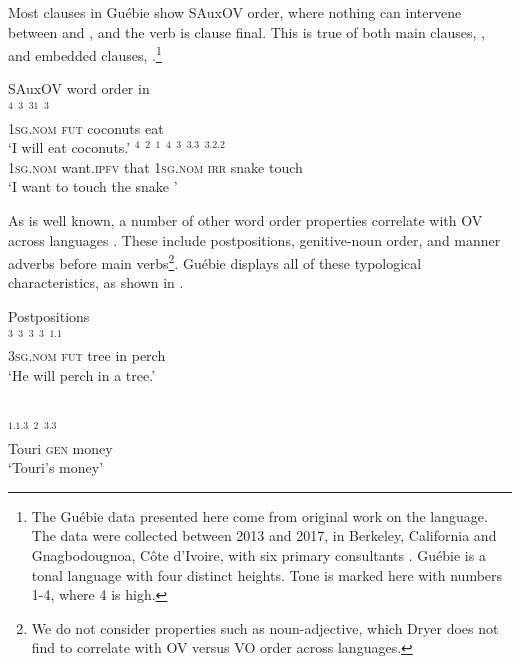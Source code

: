 \documentclass[output=paper]{LSP/langsci}
\begin{document}
Most clauses in Gu\'ebie show SAuxOV order, where nothing can intervene between  and , and the verb is clause final. This is true of both main clauses, , and embedded clauses, .\footnote{The Gu\'ebie data presented here come from original work on the language. The data were collected between 2013 and 2017, in Berkeley, California and Gnagbodougnoa, C\^ote d'Ivoire, with six primary consultants \citep[cf.][]{Sande:2017}. Gu\'ebie is a tonal language with four distinct  heights. Tone is marked here with numbers 1-4, where 4 is high.}

\ea 
\ea SAuxOV word order in \\ 
\gll {}$^{4}$ $^{3}$ $^{31}$ $^{3}$  \\
\textsc{1sg}.\textsc{nom} \textsc{fut} coconuts eat \\
\glt `I will eat coconuts.'  \label{ex:sande:3a}
\ex \gll {}$^{4}$ $^{2}$ $^{1}$ $^{4}$ \textbf{$^{3}$} $^{3.3}$ \textbf{$^{3.2.2}$} \\
\textsc{1sg}.\textsc{nom} want.\textsc{ipfv} that \textsc{1sg}.\textsc{nom} \textsc{irr} snake touch \\
\glt `I want to touch the snake ' \label{ex:sande:3b}
\z
\z


As is well known, a number of other word order properties correlate with OV across languages \citep{Greenberg:1963, dryer07}. These include postpositions, genitive-noun order, and manner adverbs before main verbs\footnote{We do not consider properties such as noun-adjective, which Dryer does not find to correlate with OV versus VO order across languages.}. Gu\'ebie displays all of these typological characteristics, as shown in .

\ea {} \label{ex:4:Guebie} 
\ea Postpositions\\
\gll {}$^{3}$ $^{3}$ \textbf{$^{3}$} \textbf{$^{3}$} $^{1.1}$ \\
\textsc{3sg}.\textsc{nom} \textsc{fut} tree in perch\\
\glt  `He will perch in a tree.' 

\\
\gll \textbf{$^{1.1.3}$} $^{2}$ \textbf{$^{3.3}$}\\
Touri \textsc{gen} money\\
\glt `Touri's money'
\end{document}
